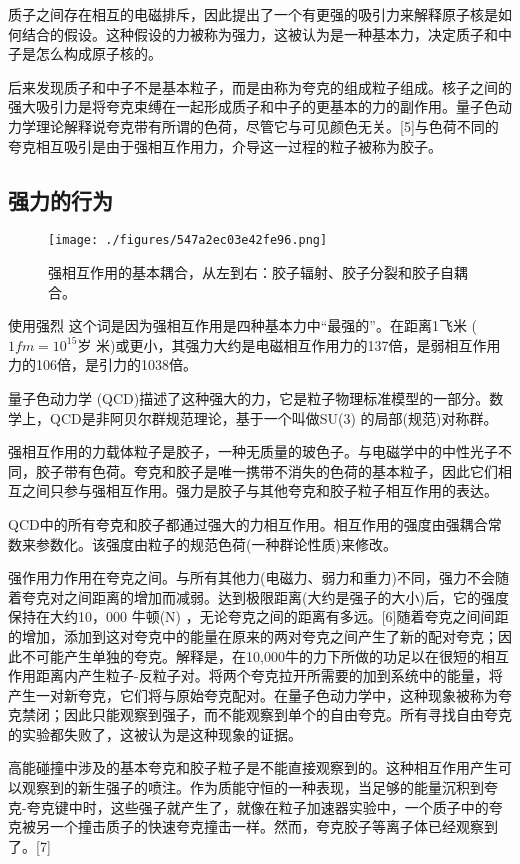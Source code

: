 质子之间存在相互的电磁排斥，因此提出了一个有更强的吸引力来解释原子核是如何结合的假设。这种假设的力被称为强力，这被认为是一种基本力，决定质子和中子是怎么构成原子核的。

后来发现质子和中子不是基本粒子，而是由称为夸克的组成粒子组成。核子之间的强大吸引力是将夸克束缚在一起形成质子和中子的更基本的力的副作用。量子色动力学理论解释说夸克带有所谓的色荷，尽管它与可见颜色无关。[5]与色荷不同的夸克相互吸引是由于强相互作用力，介导这一过程的粒子被称为胶子。

\subsection{强力的行为}
\begin{figure}[ht]
\centering
\texttt{[image: ./figures/547a2ec03e42fe96.png]}
\caption{强相互作用的基本耦合，从左到右：胶子辐射、胶子分裂和胶子自耦合。} \label{fig_QXHZY_1}
\end{figure}
使用强烈 这个词是因为强相互作用是四种基本力中“最强的”。在距离1飞米 ($1  fm = 10^{15}\text{岁}$ 米)或更小，其强力大约是电磁相互作用力的137倍，是弱相互作用力的106倍，是引力的1038倍。

量子色动力学 (QCD)描述了这种强大的力，它是粒子物理标准模型的一部分。数学上，QCD是非阿贝尔群规范理论，基于一个叫做SU(3) 的局部(规范)对称群。

强相互作用的力载体粒子是胶子，一种无质量的玻色子。与电磁学中的中性光子不同，胶子带有色荷。夸克和胶子是唯一携带不消失的色荷的基本粒子，因此它们相互之间只参与强相互作用。强力是胶子与其他夸克和胶子粒子相互作用的表达。

QCD中的所有夸克和胶子都通过强大的力相互作用。相互作用的强度由强耦合常数来参数化。该强度由粒子的规范色荷(一种群论性质)来修改。

强作用力作用在夸克之间。与所有其他力(电磁力、弱力和重力)不同，强力不会随着夸克对之间距离的增加而减弱。达到极限距离(大约是强子的大小)后，它的强度保持在大约10，000 牛顿(N) ，无论夸克之间的距离有多远。[6]随着夸克之间间距的增加，添加到这对夸克中的能量在原来的两对夸克之间产生了新的配对夸克；因此不可能产生单独的夸克。解释是，在10,000牛的力下所做的功足以在很短的相互作用距离内产生粒子-反粒子对。将两个夸克拉开所需要的加到系统中的能量，将产生一对新夸克，它们将与原始夸克配对。在量子色动力学中，这种现象被称为夸克禁闭；因此只能观察到强子，而不能观察到单个的自由夸克。所有寻找自由夸克的实验都失败了，这被认为是这种现象的证据。

高能碰撞中涉及的基本夸克和胶子粒子是不能直接观察到的。这种相互作用产生可以观察到的新生强子的喷注。作为质能守恒的一种表现，当足够的能量沉积到夸克-夸克键中时，这些强子就产生了，就像在粒子加速器实验中，一个质子中的夸克被另一个撞击质子的快速夸克撞击一样。然而，夸克胶子等离子体已经观察到了。[7]
